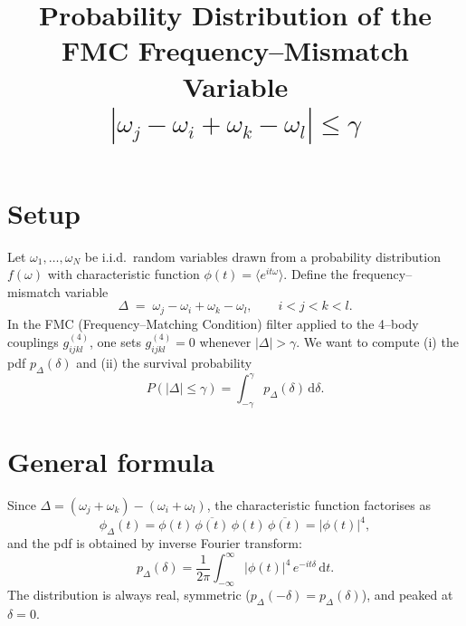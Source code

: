 \documentclass[a4paper,11pt]{article}
\title{Probability Distribution of the FMC Frequency--Mismatch Variable \\[4pt]
       \large $|\omega_j - \omega_i + \omega_k - \omega_l| \leq \gamma$}
\author{}
\date{}
\newcommand{\de}{\mathrm{d}}
\begin{document}
\maketitle

\section{Setup}

Let $\omega_1, \dots, \omega_N$ be i.i.d.\ random variables drawn from a
probability distribution $f(\omega)$ with characteristic function
$\phi(t) = \langle e^{it\omega}\rangle$.
Define the frequency--mismatch variable
\begin{equation}\label{eq:Delta}
  \Delta \;=\; \omega_j - \omega_i + \omega_k - \omega_l ,
  \qquad i<j<k<l .
\end{equation}
In the FMC (Frequency--Matching Condition) filter applied to the
4--body couplings $g_{ijkl}^{(4)}$, one sets $g_{ijkl}^{(4)} = 0$
whenever $|\Delta| > \gamma$.
We want to compute (i) the pdf $p_\Delta(\delta)$ and (ii) the
survival probability
\begin{equation}\label{eq:Pgamma}
  P(|\Delta|\leq\gamma)
  = \int_{-\gamma}^{\gamma} p_\Delta(\delta)\,\de\delta .
\end{equation}

\section{General formula}

Since $\Delta = (\omega_j + \omega_k) - (\omega_i + \omega_l)$, the
characteristic function factorises as
\begin{equation}
  \phi_\Delta(t)
  = \phi(t)\,\overline{\phi(t)}\,\phi(t)\,\overline{\phi(t)}
  = |\phi(t)|^4 ,
\end{equation}
and the pdf is obtained by inverse Fourier transform:
\begin{equation}
  p_\Delta(\delta)
  = \frac{1}{2\pi}\int_{-\infty}^{\infty}
      |\phi(t)|^4\, e^{-it\delta}\,\de t .
\end{equation}
The distribution is always real, symmetric ($p_\Delta(-\delta) = p_\Delta(\delta)$),
and peaked at $\delta=0$.
\end{document}
